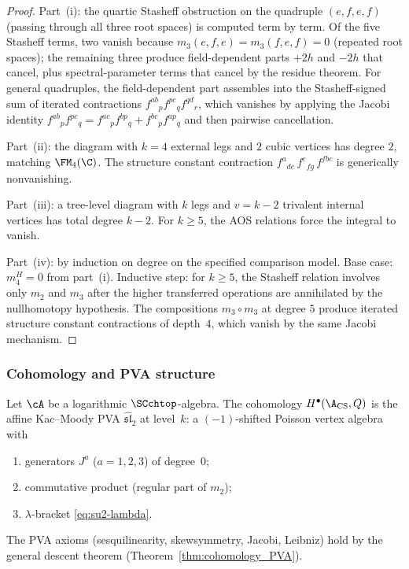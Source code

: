 \begin{proof}
Part~(i): the quartic Stasheff obstruction on the quadruple
$(e, f, e, f)$ (passing through all three root spaces) is computed
term by term. Of the five Stasheff terms, two vanish because
$m_3(e,f,e) = m_3(f,e,f) = 0$ (repeated root spaces); the
remaining three produce field-dependent parts $+2h$ and $-2h$ that
cancel, plus spectral-parameter terms that cancel by the residue
theorem. For general quadruples, the field-dependent part
assembles into the Stasheff-signed sum of iterated contractions
$f^{ab}{}_p f^{pc}{}_q f^{qd}{}_r$, which vanishes by applying
the Jacobi identity $f^{ab}{}_p f^{pc}{}_q = f^{ac}{}_p f^{bp}{}_q
+ f^{bc}{}_p f^{ap}{}_q$ and then pairwise cancellation.

Part~(ii): the diagram with $k=4$ external legs and $2$ cubic
vertices has degree $2$, matching $\FM_4(\C)$. The structure
constant contraction $f^{a}{}_{de}\, f^{e}{}_{fg}\, f^{fbc}$
is generically nonvanishing.

Part~(iii): a tree-level diagram with $k$ legs and $v = k - 2$
trivalent internal vertices has total degree $k-2$. For
$k \geq 5$, the AOS relations force the integral to vanish.

Part~(iv): by induction on degree on the specified comparison model.
Base case: $m_4^H = 0$ from
part~(i). Inductive step: for $k \geq 5$, the Stasheff relation
involves only $m_2$ and $m_3$ after the higher transferred operations
are annihilated by the nullhomotopy hypothesis. The compositions
$m_3 \circ m_3$ at degree $5$
produce iterated structure constant contractions of depth~$4$,
which vanish by the same Jacobi mechanism.
\end{proof}

\subsubsection{Cohomology and PVA structure}

\begin{theorem}
\label{thm:su2-pva}
Let\/ $\cA$ be a logarithmic\/ $\SCchtop$-algebra. The cohomology
$H^\bullet(\A_{\text{CS}}, Q)$ is the affine Kac--Moody PVA
$\widehat{\mathfrak{sl}}_2$ at level~$k$: a
$(-1)$-shifted Poisson vertex algebra with
\begin{enumerate}[label=\textup{(\roman*)}]
\item generators $J^a$ ($a = 1,2,3$) of degree~$0$;
\item commutative product (regular part of $m_2$);
\item $\lambda$-bracket \eqref{eq:su2-lambda}.
\end{enumerate}
The PVA axioms (sesquilinearity, skewsymmetry, Jacobi, Leibniz)
hold by the general descent theorem
(Theorem~\ref{thm:cohomology_PVA}).
\end{theorem}

